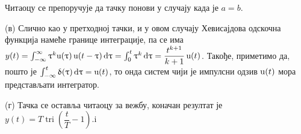 Читаоцу се препоручује да тачку понови у случају када је $a=b$. 

(в) Слично као у претходној тачки, и у овом случају Хевисајдова одскочна функција намеће границе интеграције, па се има 
$y(t) = 
\int_{-\infty}^{\infty} \uptau^k {\rm u}(\uptau) \, {\rm u}(t-\uptau)  \, {\rm d} \uptau = 
\int_{0}^{t} \uptau^k \, {\rm d} \uptau = \dfrac{t^{k+1}}{k+1} \, {\rm u}(t)$.
Такође, приметимо да, пошто је $\int_{-\infty}^t \updelta(\uptau) \, {\rm d} \uptau = {\rm u}(t)$, то онда систем 
чији је импулсни одзив ${\rm u}(t)$ мора представљати интегратор. 

(г) Тачка се оставља читаоцу за вежбу, коначан резултат је 
$y(t) = T \operatorname{tri}\left( \dfrac tT - 1  \right)$.i



